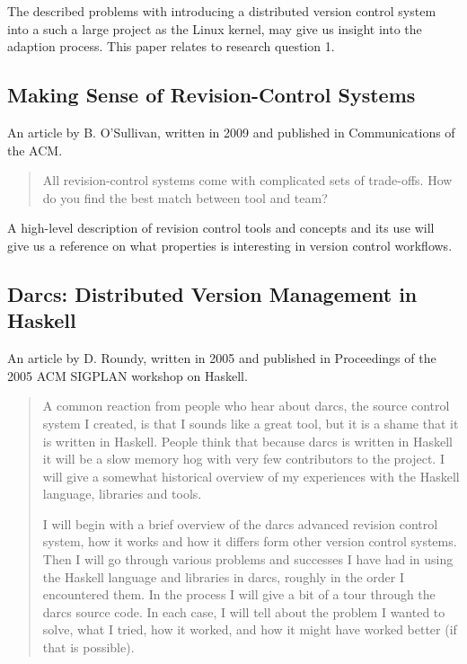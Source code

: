 \documentclass{llncs}
\begin{document}
The described problems with introducing a distributed version control
system into a such a large project as the Linux kernel, may give us
insight into the adaption process. This paper relates to research
question 1.

\subsection{Making Sense of Revision-Control Systems}

An article by B. O'Sullivan, written in 2009 and published in
Communications of the ACM.

\begin{abstract}
 All revision-control systems come with complicated sets of trade-offs. How
 do you find the best match between tool and team?
\end{abstract}

A high-level description of revision control tools and concepts and its use
will give us a reference on what properties is interesting in version
control workflows.

\subsection{Darcs: Distributed Version Management in Haskell}

An article by D. Roundy, written in 2005 and published in Proceedings of the
2005 ACM SIGPLAN workshop on Haskell.

\begin{abstract}
 A common reaction from people who hear about darcs, the source control
 system I created, is that I sounds like a great tool, but it is a shame
 that it is written in Haskell. People think that because darcs is written
 in Haskell it will be a slow memory hog with very few contributors to the
 project. I will give a somewhat historical overview of my experiences with
 the Haskell language, libraries and tools.

 I will begin with a brief overview of the darcs advanced revision control
 system, how it works and how it differs form other version control systems.
 Then I will go through various problems and successes I have had in using
 the Haskell language and libraries in darcs, roughly in the order I
 encountered them. In the process I will give a bit of a tour through the
 darcs source code. In each case, I will tell about the problem I wanted to
 solve, what I tried, how it worked, and how it might have worked better (if
 that is possible).
\end{abstract}
\end{document}
